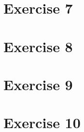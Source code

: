 \documentclass[twoside, a4paper, fleqn, reqno]{article}
\begin{document}
\section*{Exercise 7}

\section*{Exercise 8}

\section*{Exercise 9}

\section*{Exercise 10}
\end{document}
